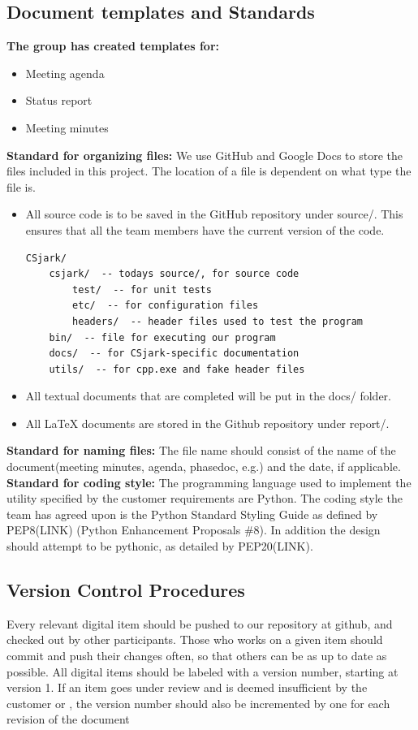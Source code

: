 \subsection{Document templates and Standards}

\textbf{The group has created templates for:}
\begin{itemize}
	\item Meeting agenda
	\item Status report
	\item Meeting minutes
\end{itemize}
\textbf{Standard for organizing files:} \newline
We use GitHub and Google Docs to store the files included in this project. The location of a file is dependent on what type the file is. 
\begin{itemize}
	\item All source code is to be saved in the GitHub repository under source/. This ensures that all the team members have the current version of the code.
		\begin{verbatim}
CSjark/
    csjark/  -- todays source/, for source code
        test/  -- for unit tests
        etc/  -- for configuration files
        headers/  -- header files used to test the program
    bin/  -- file for executing our program
    docs/  -- for CSjark-specific documentation
    utils/  -- for cpp.exe and fake header files
		\end{verbatim}
	\item All textual documents that are completed will be put in the docs/ folder.
	\item All LaTeX documents are stored in the Github repository under report/.
\end{itemize}
\textbf{Standard for naming files:} \newline
The file name should consist of the name of the document(meeting minutes, agenda, phasedoc, e.g.) and the date, if applicable. \newline
\textbf{Standard for coding style:} \newline
The programming language used to implement the utility specified by the customer requirements are Python. The coding style the team has agreed upon is the Python Standard Styling Guide as defined by PEP8(LINK) (Python Enhancement Proposals \#8). In addition the design should attempt to be pythonic, as detailed by PEP20(LINK).

\subsection{Version Control Procedures}
Every relevant digital item should be pushed to our repository at github, and checked out by other participants. Those who works on a given item should commit and push their changes often, so that others can be as up to date as possible. All digital items should be labeled with a version number, starting at version 1. If an item goes under review and is deemed insufficient by the customer or  , the version number should also be incremented by one for each revision of the document

